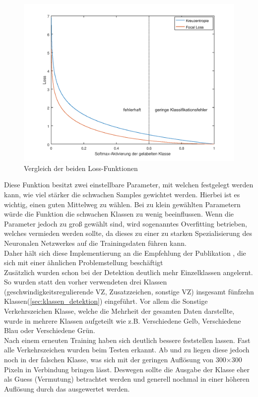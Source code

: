 \documentclass[12pt,a4paper,ngerman,enabledeprecatedfontcommands]{scrreprt}
\begin{document}
\begin{figure}[H]
\centering
\includegraphics[width=1.1\linewidth]{Grafiken/lossfunktionen.png}
\caption{Vergleich der beiden Loss-Funktionen}
\label{fig:lossfunktionen}
\end{figure}

Diese Funktion besitzt zwei einstellbare Parameter, mit welchen festgelegt werden kann, wie viel stärker die schwachen \gls{Sample}s gewichtet werden. \cite{DBLP:journals/corr/abs-1708-02002} Hierbei ist es wichtig, einen guten Mittelweg zu wählen. Bei zu klein gewählten Parametern würde die Funktion die schwachen Klassen zu wenig beeinflussen. Wenn die Parameter jedoch zu groß gewählt sind, wird sogenanntes \glqq{}Overfitting\grqq{} betrieben, welches vermieden werden sollte, da dieses zu einer zu starken Spezialisierung des Neuronalen Netzwerkes auf die Trainingsdaten führen kann.\\
Daher hält sich diese Implementierung an die Empfehlung der Publikation \cite{DBLP:journals/corr/abs-1708-02002}, die sich mit einer ähnlichen Problemstellung beschäftigt\\


Zusätzlich wurden schon bei der Detektion deutlich mehr Einzelklassen angelernt. So wurden statt den vorher verwendeten drei Klassen (geschwindigkeitsregulierende \gls{VZ}, Zusatzzeichen, sonstige \gls{VZ}) insgesamt fünfzehn Klassen(\cref{sec:klassen_detektion})
eingeführt. Vor allem die \glqq{}Sonstige Verkehrszeichen\grqq{} Klasse, welche die Mehrheit der gesamten Daten darstellte, wurde in mehrere Klassen aufgeteilt wie z.B. \glqq{}Verschiedene Gelb\grqq{}, \glqq{}Verschiedene Blau\grqq{} oder \glqq{}Verschiedene Grün\grqq{}.\\
Nach einem erneuten Training haben sich deutlich bessere  feststellen lassen. Fast alle Verkehrszeichen wurden beim Testen erkannt. Ab und zu liegen diese jedoch noch in der falschen Klasse, was sich mit der geringen Auflösung von 300$\times$300 Pixeln in Verbindung bringen lässt. Deswegen sollte die Ausgabe der Klasse eher als \glqq{}Guess\grqq{} (Vermutung) betrachtet werden und generell nochmal in einer höheren Auflösung durch das  ausgewertet werden.\\
\end{document}

